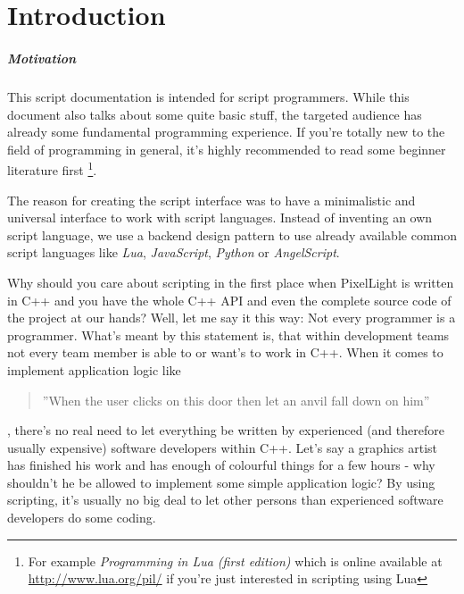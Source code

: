 \chapter{Introduction}


\paragraph{Motivation}
This script documentation is intended for script programmers. While this document also talks about some quite basic stuff, the targeted audience has already some fundamental programming experience. If you're totally new to the field of programming in general, it's highly recommended to read some beginner literature first \footnote{For example \emph{Programming in Lua (first edition)} which is online available at \url{http://www.lua.org/pil/} if you're just interested in scripting using Lua}.

The reason for creating the script interface was to have a minimalistic and universal interface to work with script languages. Instead of inventing an own script language, we use a backend design pattern to use already available common script languages like \emph{Lua}, \emph{JavaScript}, \emph{Python} or \emph{AngelScript}.

Why should you care about scripting in the first place when PixelLight is written in C++ and you have the whole C++ API and even the complete source code of the project at our hands? Well, let me say it this way: Not every programmer is a programmer. What's meant by this statement is, that within development teams not every team member is able to or want's to work in C++. When it comes to implement application logic like \begin{quote}''When the user clicks on this door then let an anvil fall down on him''\end{quote}, there's no real need to let everything be written by experienced (and therefore usually expensive) software developers within C++. Let's say a graphics artist has finished his work and has enough of colourful things for a few hours - why shouldn't he be allowed to implement some simple application logic? By using scripting, it's usually no big deal to let other persons than experienced software developers do some coding.

